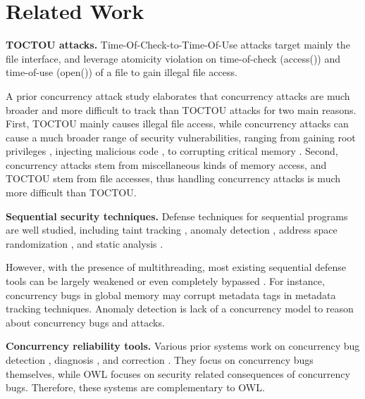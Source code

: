 \section{Related Work} \label{sec:related}


\textbf{TOCTOU attacks.} Time-Of-Check-to-Time-Of-Use attacks \cite{bishop1996checking,tsyrklevich2003dynamic, tsafrir2008portably,wei2005tocttou}
target mainly the file interface, and
leverage atomicity violation on time-of-check (access())
and time-of-use (open()) of a file to gain illegal file access.

A prior concurrency attack study \cite{yang2016concurrency} elaborates that concurrency
attacks are much broader and more difficult to track
than TOCTOU attacks for two main reasons. First, TOCTOU
mainly causes illegal file access, while concurrency attacks
can cause a much broader range of security vulnerabilities,
ranging from gaining root privileges \cite{uselib-bug-12791} , injecting malicious
code \cite{freebsdcve}, to corrupting critical memory \cite{apache-bug-25520}. Second, concurrency
attacks stem from miscellaneous kinds of memory access, and
TOCTOU stem from file accesses, thus handling concurrency
attacks is much more difficult than TOCTOU.

\noindent
\textbf{Sequential security techniques.} Defense techniques for sequential
programs are well studied, including taint tracking \cite{taintdroid:osdi10,lift:micro06,sospinfomationflowcontrol,valgrind:pldi}, 
anomaly detection \cite{taskrecycling:ppopp90,schonberg:pldi89}, address space
randomization \cite{aslr-fail:ccs04}, and static analysis \cite{seth:pldi,engler:vmcai,wagner:intrusion,coverity:cacm,klee:osdi08}.

However, with the presence of multithreading, most existing
sequential defense tools can be largely weakened or even
completely bypassed \cite{con-tr}. For instance, concurrency bugs
in global memory may corrupt metadata tags in metadata
tracking techniques. Anomaly detection is lack of a concurrency
model to reason about concurrency bugs and attacks.

\noindent
\textbf{Concurrency reliability tools.} Various prior systems work
on concurrency bug detection \cite{yu:racetrack:sosp,savage:eraser,racerx:sosp03,lu:muvi:sosp,avio:asplos06,conmem:asplos10,conseq:asplos11,kasikci2013racemob,wester:parallelizing:asplos13}, diagnosis \cite{racefuzzer:pldi08,ctrigger:asplos09,atomfuzzer:fse08,attariyan2012x,failure:sketch:sosp15}, and correction \cite{deadlock-immunity:osdi08,gadara:osdi08,wu:loom:osdi10,automated:osdi}. They focus on concurrency bugs themselves, while
OWL focuses on security related consequences of concurrency
bugs. Therefore, these systems are complementary to OWL.

